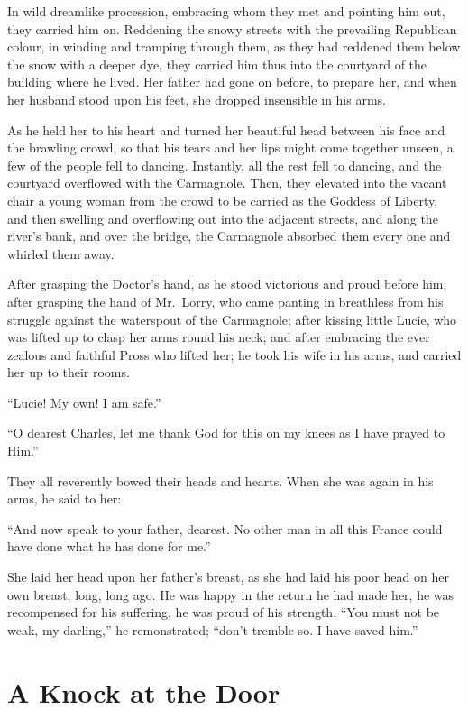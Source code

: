 In wild dreamlike procession, embracing whom they met and pointing
him out, they carried him on.  Reddening the snowy streets with the
prevailing Republican colour, in winding and tramping through them,
as they had reddened them below the snow with a deeper dye, they
carried him thus into the courtyard of the building where he lived.
Her father had gone on before, to prepare her, and when her husband
stood upon his feet, she dropped insensible in his arms.

As he held her to his heart and turned her beautiful head between his
face and the brawling crowd, so that his tears and her lips might
come together unseen, a few of the people fell to dancing. Instantly,
all the rest fell to dancing, and the courtyard overflowed with the
Carmagnole. Then, they elevated into the vacant chair a young woman
from the crowd to be carried as the Goddess of Liberty, and then
swelling and overflowing out into the adjacent streets, and along the
river's bank, and over the bridge, the Carmagnole absorbed them every
one and whirled them away.

After grasping the Doctor's hand, as he stood victorious and proud
before him; after grasping the hand of Mr.\ Lorry, who came panting in
breathless from his struggle against the waterspout of the Carmagnole;
after kissing little Lucie, who was lifted up to clasp her arms round
his neck; and after embracing the ever zealous and faithful Pross who
lifted her; he took his wife in his arms, and carried her up to their
rooms.

``Lucie!  My own!  I am safe.''

``O dearest Charles, let me thank God for this on my knees as I have
prayed to Him.''

They all reverently bowed their heads and hearts.  When she was again
in his arms, he said to her:

``And now speak to your father, dearest.  No other man in all this
France could have done what he has done for me.''

She laid her head upon her father's breast, as she had laid his poor
head on her own breast, long, long ago.  He was happy in the return
he had made her, he was recompensed for his suffering, he was proud
of his strength.  ``You must not be weak, my darling,'' he remonstrated;
``don't tremble so.  I have saved him.''



\chapter{A Knock at the Door}


